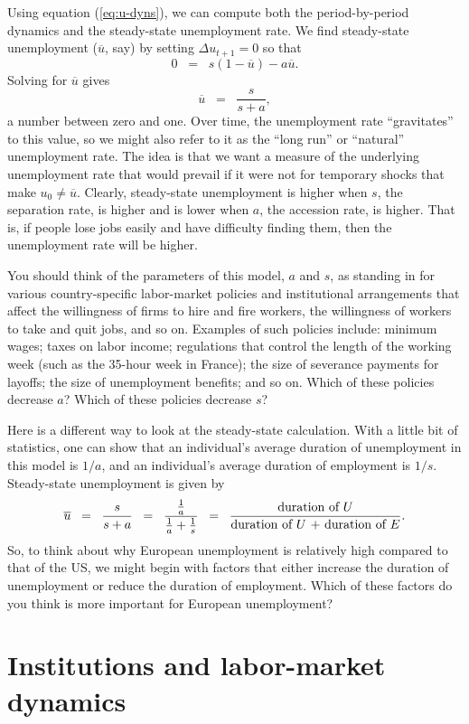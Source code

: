 Using equation (\ref{eq:u-dyns}), we can compute
both the period-by-period dynamics and the steady-state unemployment rate.
We find steady-state unemployment ($\overline{u}$, say) by setting $\Delta u_{t+1}=0$ so that
\[
    0 \;\;=\;\; s(1-\overline{u})-a\overline{u}.
\]
Solving for $\overline{u}$ gives
\[
    \overline{u} \;\;=\;\; \frac{s}{s+a},
\]
a number between zero and one. Over time, the unemployment rate ``gravitates'' to this value, so we might also refer to it as the ``long run'' or ``natural'' unemployment rate.
The idea is that we want a measure of the underlying unemployment rate that would prevail if it were not for temporary shocks that make $u_0\ne\overline{u}$.
Clearly, steady-state unemployment is higher when $s$, the separation rate, is higher and is lower when $a$, the accession rate, is higher. That is, if people lose jobs easily and have difficulty finding them, then the unemployment rate will be higher.

You should think of the parameters of this model, $a$ and $s$, as standing in for various country-specific labor-market policies and institutional arrangements that affect the willingness of firms to hire and fire workers, the willingness of workers to take and quit jobs, and so on.
Examples of such policies include: minimum wages;
taxes on labor income; regulations that control the length of the working week (such as the 35-hour week in France); the size of severance payments for layoffs; the size of unemployment benefits; and so on. Which of these policies decrease $a$? Which of these policies decrease $s$?

Here is a different way to look at the steady-state calculation. With a little bit of statistics, one can show that an individual's average duration of unemployment in this model is $1/a$, and an individual's average duration of employment is $1/s$. Steady-state unemployment is given by
\[
    \overline{u} \;\;=\;\; \frac{s}{s+a} \;\;=\;\;
        \frac{\frac{1}{a}}{\frac{1}{a}+\frac{1}{s}}
        \;\;=\;\; \frac{\textmd{duration of  $U$}}{\textmd{duration of $U$ + duration of $E$}}.
\]
So, to think about why European unemployment is relatively high compared to that of the US, we might begin with factors that either increase the duration of unemployment or reduce the duration of employment. Which of these factors do you think is more important for European unemployment?


\section{Institutions and labor-market dynamics}

